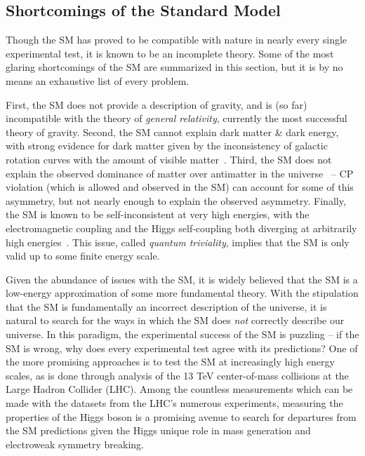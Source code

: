 \subsection{Shortcomings of the Standard Model} \label{sec:theory_sm_problems}
Though the SM has proved to be compatible with nature in nearly every single experimental test, it is known to be an incomplete theory.
Some of the most glaring shortcomings of the SM are summarized in this section, but it is by no means an exhaustive list of every problem.

First, the SM does not provide a description of gravity, and is (so far) incompatible with the theory of \emph{general relativity}, currently the most successful theory of gravity.
Second, the SM cannot explain dark matter \& dark energy, with strong evidence for dark matter given by the inconsistency of galactic rotation curves with the amount of visible matter~\cite{Rubin:1980zd}.
Third, the SM does not explain the observed dominance of matter over antimatter in the universe~\cite{Dine:2003ax} -- CP violation (which is allowed and observed in the SM) can account for some of this asymmetry, but not nearly enough to explain the observed asymmetry.
Finally, the SM is known to be self-inconsistent at very high energies, with the electromagnetic coupling and the Higgs self-coupling both diverging at arbitrarily high energies~\cite{Gockeler:1997dn,Chivukula:1999az}.
This issue, called \emph{quantum triviality}, implies that the SM is only valid up to some finite energy scale.

Given the abundance of issues with the SM, it is widely believed that the SM is a low-energy approximation of some more fundamental theory.
With the stipulation that the SM is fundamentally an incorrect description of the universe, it is natural to search for the ways in which the SM does \emph{not} correctly describe our universe.
In this paradigm, the experimental success of the SM is puzzling -- if the SM is wrong, why does every experimental test agree with its predictions?
One of the more promising approaches is to test the SM at increasingly high energy scales, as is done through analysis of the 13 TeV center-of-mass collisions at the Large Hadron Collider (LHC).
Among the countless measurements which can be made with the datasets from the LHC's numerous experiments, measuring the properties of the Higgs boson is a promising avenue to search for departures from the SM predictions given the Higgs unique role in mass generation and electroweak symmetry breaking.
